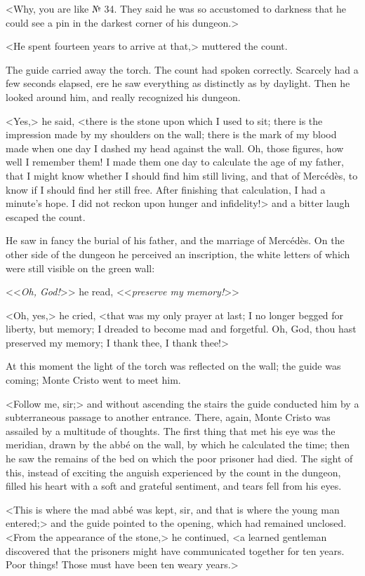  <Why, you are like № 34. They said he was so accustomed to darkness that he could see a pin in the darkest corner of his dungeon.> 

 <He spent fourteen years to arrive at that,> muttered the count. 

 The guide carried away the torch. The count had spoken correctly. Scarcely had a few seconds elapsed, ere he saw everything as distinctly as by daylight. Then he looked around him, and really recognized his dungeon. 

 <Yes,> he said, <there is the stone upon which I used to sit; there is the impression made by my shoulders on the wall; there is the mark of my blood made when one day I dashed my head against the wall. Oh, those figures, how well I remember them! I made them one day to calculate the age of my father, that I might know whether I should find him still living, and that of Mercédès, to know if I should find her still free. After finishing that calculation, I had a minute's hope. I did not reckon upon hunger and infidelity!> and a bitter laugh escaped the count. 

 He saw in fancy the burial of his father, and the marriage of Mercédès. On the other side of the dungeon he perceived an inscription, the white letters of which were still visible on the green wall: 

 <<\textit{Oh, God!}>> he read, <<\textit{preserve my memory!}>> 

 <Oh, yes,> he cried, <that was my only prayer at last; I no longer begged for liberty, but memory; I dreaded to become mad and forgetful. Oh, God, thou hast preserved my memory; I thank thee, I thank thee!> 

 At this moment the light of the torch was reflected on the wall; the guide was coming; Monte Cristo went to meet him. 

 <Follow me, sir;> and without ascending the stairs the guide conducted him by a subterraneous passage to another entrance. There, again, Monte Cristo was assailed by a multitude of thoughts. The first thing that met his eye was the meridian, drawn by the abbé on the wall, by which he calculated the time; then he saw the remains of the bed on which the poor prisoner had died. The sight of this, instead of exciting the anguish experienced by the count in the dungeon, filled his heart with a soft and grateful sentiment, and tears fell from his eyes. 

 <This is where the mad abbé was kept, sir, and that is where the young man entered;> and the guide pointed to the opening, which had remained unclosed. <From the appearance of the stone,> he continued, <a learned gentleman discovered that the prisoners might have communicated together for ten years. Poor things! Those must have been ten weary years.> 

